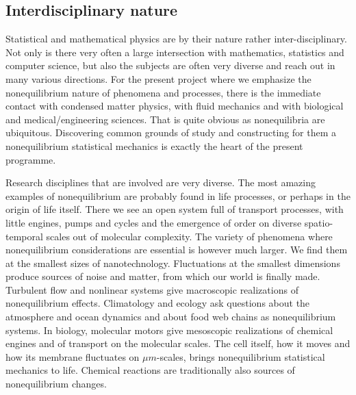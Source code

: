 \subsection{Interdisciplinary nature}\label{sec:interdisc}


Statistical and mathematical physics are by their nature rather inter-disciplinary.  Not
only is there very often a large intersection with mathematics, statistics and computer
science, but also the subjects are often very diverse and reach out in many various
directions.  For the present project where we emphasize the nonequilibrium nature of
phenomena and processes, there is the immediate contact with condensed matter physics, with
fluid mechanics and with biological and medical/engineering sciences.  That is quite obvious
as nonequilibria are ubiquitous.  Discovering common grounds of study and constructing for
them a nonequilibrium statistical mechanics is exactly the heart of the present programme.

Research disciplines that are involved are very diverse. The most amazing examples of
nonequilibrium are probably found in life processes, or perhaps in the origin of life
itself.  There we see an open system full of transport processes, with little engines, pumps
and cycles and the emergence of order on diverse spatio-temporal scales out of molecular
complexity. The variety of phenomena where nonequilibrium considerations are essential is
however much larger.  We find them at the smallest sizes of nanotechnology. Fluctuations at
the smallest dimensions produce sources of noise and matter, from which our world is finally
made.  Turbulent flow and nonlinear systems give macroscopic realizations of nonequilibrium
effects.  Climatology and ecology ask questions about the atmosphere and ocean dynamics and
about food web chains as nonequilibrium systems.  In biology, molecular motors give
mesoscopic realizations of chemical engines and of transport on the molecular scales.  The
cell itself, how it moves and how its membrane fluctuates on $\mu m$-scales, brings
nonequilibrium statistical mechanics to life.  Chemical reactions are traditionally also
sources of nonequilibrium changes.





